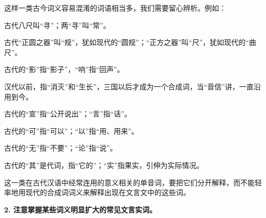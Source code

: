 这样一类古今词义容易混淆的词语相当多，我们需要留心辨析。例如：

\begin{entry}
\item[寻常：]古代八尺叫“寻”；两“寻”叫“常”。

\item[规矩：]古代“正圆之器”叫“规”，犹如现代的“圆规”；“正方之器”叫“尺”，犹如现代的“曲尺”。

\item[影响：]古代的“影”指“影子”，“响”指“回声”。

\item[消息：]汉代以前，指“消灭”和“生长”，三国以后才成为一个合成词，当“音信”讲，一直沿用到今。

\item[宣言：]古代的“宣”指“公开说出”；“言”指“话”。

\item[可以：]古代的“可”指“可以”；“以”指“用、用来”。

\item[无论：]古代的“无”指“不要”；“论”指“说”。

\item[其实：]古代的“其”是代词，指“它的”；“实”指果实，引伸为实际情况。
\end{entry}

这一类在古代汉语中经常连用的意义相关的单音词，要把它们分开解释，而不能轻率地用现代的合成词词义来解释出现在文言文中的这些词。

\textbf{2. 注意掌握某些词义明显扩大的常见文言实词。}

